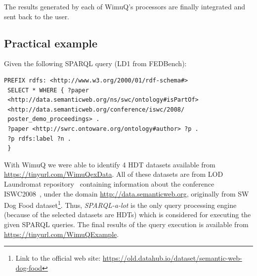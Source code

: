 The results generated by each of WimuQ's processors are finally integrated and sent back to the user. 

\subsection{Practical example}
Given the following SPARQL query (LD1 from FEDBench\cite{fedbench2011}):

\begin{lstlisting}[language=SPARQL]
 PREFIX rdfs: <http://www.w3.org/2000/01/rdf-schema#>
 SELECT * WHERE { ?paper 
 <http://data.semanticweb.org/ns/swc/ontology#isPartOf> 
 <http://data.semanticweb.org/conference/iswc/2008/
 poster_demo_proceedings> .
 ?paper <http://swrc.ontoware.org/ontology#author> ?p .
 ?p rdfs:label ?n .
 }
\end{lstlisting}

 






With WimuQ we were able to identify 4 HDT datasets available from 
\url{https://tinyurl.com/WimuQexData}. All of these datasets are
from LOD Laundromat repository~\cite{beek2014lod} containing information about the conference ISWC2008~\cite{sheth2008semantic}, under the domain \url{http://data.semanticweb.org}, originally from SW Dog Food dataset\footnote{Link to the official web site: \url{https://old.datahub.io/dataset/semantic-web-dog-food}}. Thus, \emph{SPARQL-a-lot} is the only query processing engine (because of the selected datasets are HDTs) which is considered for executing the given SPARQL queries. The final results of the query execution is available from \url{https://tinyurl.com/WimuQExample}. 



